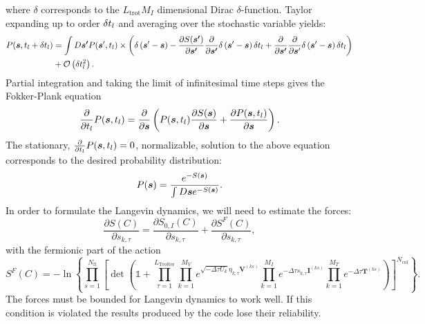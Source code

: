 where $\delta$ corresponds to the $L_\mathrm{trot} M_I $  dimensional Dirac $\delta$-function.   Taylor expanding  up to order $\delta t_{l}$  and averaging over the stochastic variable yields:
\begin{align}
P(\boldsymbol{s}, t_{l}  + \delta t_{l} ) &  = \int D\boldsymbol{s'}  P  (\boldsymbol{s}', t_{l}  )   \times \left(   \delta \left(  \boldsymbol{s}' - \boldsymbol{s}   \right)
- \frac{\partial S(\boldsymbol{s'}) }{\partial    \boldsymbol{s'} }   \frac{\partial  }{\partial    \boldsymbol{s'} } \delta \left(  \boldsymbol{s}' - \boldsymbol{s} \right)  \delta t_{l}   +
   \frac{\partial  }{\partial    \boldsymbol{s'} }   \frac{\partial  }{\partial    \boldsymbol{s}' }  \delta \left(  \boldsymbol{s}' - \boldsymbol{s}\right)    \delta t_{l}
\right)  \nonumber   \\
  &  + {\cal O}  \left(  \delta t_{l}^2 \right).
\end{align}
Partial integration  and taking the limit of infinitesimal time steps   gives the Fokker-Plank equation
\begin{equation}
         \frac{\partial  }{\partial   t_{l}}  P( \boldsymbol{s}, t_{l})  =  \frac{\partial  }{\partial    \boldsymbol{s} }  \left( P( \boldsymbol{s}, t_{l})  \frac{\partial S(\boldsymbol{s}) }{\partial     \boldsymbol{s} }   +
          \frac{\partial P(\boldsymbol{s},t_{l}) }{\partial     \boldsymbol{s} }
         \right) .
\end{equation}
The stationary,  $ \frac{\partial  }{\partial   t_{l}}  P( \boldsymbol{s}, t_{l}) =0$,  normalizable,  solution to the above equation corresponds to the desired probability distribution:
\begin{equation}
          P(\boldsymbol{s}) =  \frac{ e^{ - S(\boldsymbol{s}) } }   {   \int D \boldsymbol{s}  e^{ - S(\boldsymbol{s}) } }.
\end{equation}
In order to formulate  the Langevin dynamics, we will need  to estimate the forces:
\begin{equation}
	\frac { \partial S(C)}{\partial s_{k,\tau} } =\frac { \partial S_{0,I}(C)}{\partial s_{k,\tau} } +  \frac { \partial S^F(C)}{\partial s_{k,\tau} },
\end{equation}
with the fermionic part of the action 
\begin{equation}
S^F(C) = - \ln{ \left\{
  \prod_{s=1}^{N_{\mathrm{fl}}}\left[\det\left(  \mathds{1} + 
     \prod_{\tau=1}^{L_{\mathrm{Trotter}}}   
 \prod_{k=1}^{M_V}   e^{  \sqrt{ -\Delta \tau  U_k} \eta_{k,\tau} {\bm V}^{(ks)} }   \prod_{k=1}^{M_I}   e^{  -\Delta \tau s_{k,\tau}  {\bm I}^{(ks)}}  
     \prod_{k=1}^{M_T}   e^{-\Delta \tau {\bm T}^{(ks)}} 
     \right) \right]^{N_{\mathrm{col}}} \right\}} .
\end{equation} 
The forces must be bounded for Langevin dynamics to work well. If this condition is violated the results produced by the code lose their reliability. 


